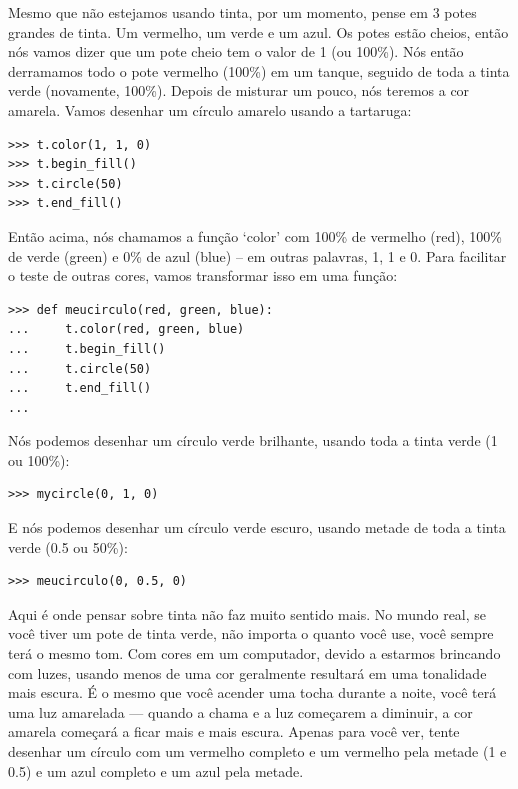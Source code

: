 {Mesmo que não estejamos usando tinta, por um momento, pense em 3 potes grandes de tinta. Um vermelho, um verde e um azul. Os potes estão cheios, então nós vamos dizer que um pote cheio tem o valor de 1 (ou 100\%). Nós então derramamos todo o pote vermelho (100\%) em um tanque, seguido de toda a tinta verde (novamente, 100\%). Depois de misturar um pouco, nós teremos a cor amarela. Vamos desenhar um círculo amarelo usando a tartaruga:

\begin{listing}
\begin{verbatim}
>>> t.color(1, 1, 0)
>>> t.begin_fill()
>>> t.circle(50)
>>> t.end_fill()
\end{verbatim}
\end{listing}

Então acima, nós chamamos a função `color' com 100\% de vermelho (red), 100\% de verde (green) e 0\% de azul (blue) -- em outras palavras, 1, 1 e 0. Para facilitar o teste de outras cores, vamos transformar isso em uma função:

\begin{listing}
\begin{verbatim}
>>> def meucirculo(red, green, blue):
...     t.color(red, green, blue)
...     t.begin_fill()
...     t.circle(50)
...     t.end_fill()
...
\end{verbatim}
\end{listing}

\noindent
Nós podemos desenhar um círculo verde brilhante, usando toda a tinta verde (1 ou 100\%):

\begin{listing}
\begin{verbatim}
>>> mycircle(0, 1, 0)
\end{verbatim}
\end{listing}

\noindent
E nós podemos desenhar um círculo verde escuro, usando metade de toda a tinta verde (0.5 ou 50\%):

\begin{listing}
\begin{verbatim}
>>> meucirculo(0, 0.5, 0)
\end{verbatim}
\end{listing}

Aqui é onde pensar sobre tinta não faz muito sentido mais. No mundo real, se você tiver um pote de tinta verde, não importa o quanto você use, você sempre terá o mesmo tom. Com cores em um computador, devido a estarmos brincando com luzes, usando menos de uma cor geralmente resultará em uma tonalidade mais escura. É o mesmo que você acender uma tocha durante a noite, você terá uma luz amarelada --- quando a chama e a luz começarem a diminuir, a cor amarela começará a ficar mais e mais escura. Apenas para você ver, tente desenhar um círculo com um vermelho completo e um vermelho pela metade (1 e 0.5) e um azul completo e um azul pela metade.

}
